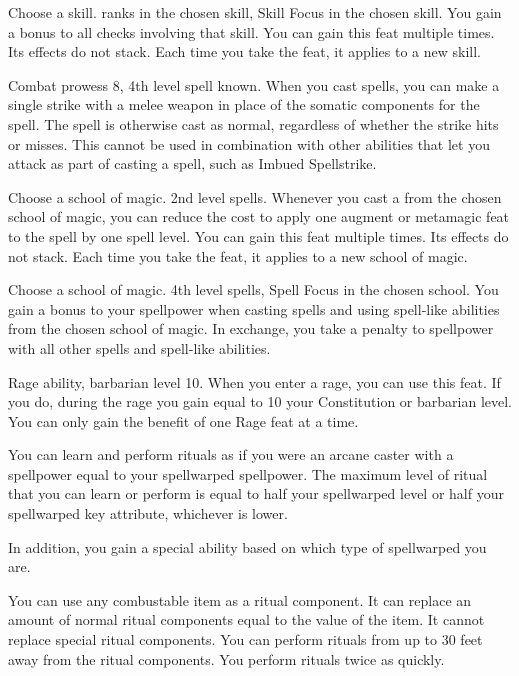 Choose a skill.
 ranks in the chosen skill, Skill Focus in the chosen skill.
\featben You gain a  bonus to all checks involving that skill.
You can gain this feat multiple times.
Its effects do not stack.
Each time you take the feat, it applies to a new skill.

\featpre Combat prowess 8, 4th level spell known.
\featben When you cast spells, you can make a single strike with a melee weapon in place of the somatic components for the spell.
The spell is otherwise cast as normal, regardless of whether the strike hits or misses.
This cannot be used in combination with other abilities that let you attack as part of casting a spell, such as Imbued Spellstrike.

Choose a school of magic.
\featpre 2nd level spells.
\featben Whenever you cast a from the chosen school of magic, you can reduce the cost to apply one augment or metamagic feat to the spell by one spell level.
You can gain this feat multiple times.
Its effects do not stack.
Each time you take the feat, it applies to a new school of magic.

Choose a school of magic.
\featpres 4th level spells, Spell Focus in the chosen school.
\featben You gain a  bonus to your spellpower when casting spells and using spell-like abilities from the chosen school of magic.
In exchange, you take a  penalty to spellpower with all other spells and spell-like abilities.

\featpre Rage ability, barbarian level 10.
\featben When you enter a rage, you can use this feat. If you do, during the rage you gain  equal to 10 \add your Constitution or barbarian level.
 You can only gain the benefit of one Rage feat at a time.

\featben You can learn and perform rituals as if you were an arcane caster with a spellpower equal to your spellwarped spellpower.
The maximum level of ritual that you can learn or perform is equal to half your spellwarped level or half your spellwarped key attribute, whichever is lower.

In addition, you gain a special ability based on which type of spellwarped you are.

 \x
{}
You can use any combustable item as a ritual component.
It can replace an amount of normal ritual components equal to the value of the item.
It cannot replace special ritual components.
You can perform rituals from up to 30 feet away from the ritual components.
You perform rituals twice as quickly.

